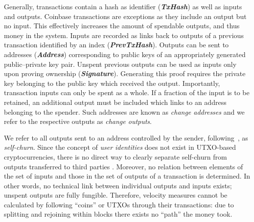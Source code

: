 Generally, transactions contain a hash as identifier
({\ttfamily\bfseries\slshape TxHash}) as well as inputs and outputs. %
Coinbase transactions are exceptions as they include an output but no
input. %
This effectively increases the amount of spendable outputs, and thus money in
the system. %
Inputs are recorded as links back to outputs of a previous transaction
identified by an index ({\ttfamily\bfseries\slshape PrevTxHash}). %
Outputs can be sent to addresses ({\ttfamily\bfseries\slshape Address})
corresponding to public keys of an appropriately generated public--private
key pair. %
Unspent previous outputs can be used as inputs only upon proving ownership
({\ttfamily\bfseries\slshape Signature}). %
Generating this proof requires the private key belonging to the public key
which received the output. %
Importantly, transaction inputs can only be spent as a whole. %
If a fraction of the input is to be retained, an additional output must be
included which links to an address belonging to the spender. %
Such addresses are known as \textit{change addresses} and we refer to the
respective outputs as \textit{change outputs}. %

We refer to all outputs sent to an address controlled by the sender,
following~\cite{kalodner2017blocksci}, as \emph{self-churn}. %
Since the concept of \textit{user identities} does not exist in UTXO-based
cryptocurrencies, there is no direct way to clearly separate self-churn from
outputs transferred to third parties \citep[cf.][]{meiklejohn2013fistful}. %
Moreover, no relation between elements of the set of inputs and those in the
set of outputs of a transaction is determined. %
In other words, no technical link between individual outputs and inputs
exists; unspent outputs are fully fungible. %
Therefore, velocity measures cannot be calculated by following ``coins'' or
UTXOs through their transactions: due to splitting and rejoining within
blocks there exists no ``path'' the money took.




